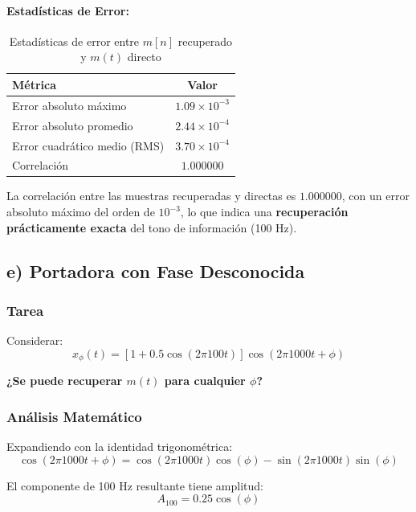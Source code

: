 \documentclass[12pt]{article}
\begin{document}
\paragraph*{Estadísticas de Error:}
\begin{table}[H]
\centering
\begin{tabular}{lc}
\toprule
\textbf{Métrica} & \textbf{Valor} \\
\midrule
Error absoluto máximo & $1.09 \times 10^{-3}$ \\
Error absoluto promedio & $2.44 \times 10^{-4}$ \\
Error cuadrático medio (RMS) & $3.70 \times 10^{-4}$ \\
Correlación & $1.000000$ \\
\bottomrule
\end{tabular}
\caption{Estadísticas de error entre $m[n]$ recuperado y $m(t)$ directo}
\end{table}

La correlación entre las muestras recuperadas y directas es $1.000000$, con un error absoluto máximo del orden de $10^{-3}$, lo que indica una \textbf{recuperación prácticamente exacta} del tono de información (100 Hz).

\subsection*{e) Portadora con Fase Desconocida}

\subsubsection*{Tarea}

Considerar: 
\begin{equation}
x_\phi(t) = \left[1 + 0.5\cos(2\pi 100t)\right] \cos(2\pi 1000t + \phi)
\end{equation}

\textbf{¿Se puede recuperar $m(t)$ para cualquier $\phi$?}

\subsubsection*{Análisis Matemático}

Expandiendo con la identidad trigonométrica:
\begin{equation}
\cos(2\pi 1000t + \phi) = \cos(2\pi 1000t)\cos(\phi) - \sin(2\pi 1000t)\sin(\phi)
\end{equation}

El componente de 100 Hz resultante tiene amplitud:
\begin{equation}
\boxed{A_{100} = 0.25 \cos(\phi)}
\end{equation}
\end{document}
